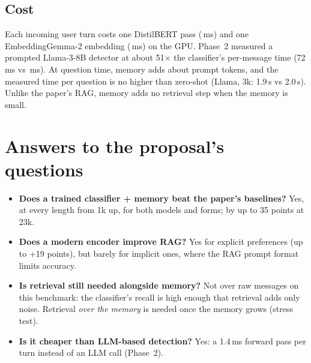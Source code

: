 \documentclass[11pt,a4paper]{article}
\begin{document}
\subsection{Cost}
Each incoming user turn costs one DistilBERT pass (\qClfLat\,ms) and one EmbeddingGemma-2 embedding (\qGemLat\,ms) on the GPU. Phase~2 measured
a prompted Llama-3-8B detector at about 51$\times$ the classifier's per-message time (72\,ms vs \qClfLat\,ms). At question time, memory adds about
\qTokAdd{} prompt tokens, and the measured time per question is no higher than zero-shot (Llama, 3k: 1.9\,s vs 2.0\,s). Unlike the paper's RAG, memory adds no retrieval step when the memory is small.

\section{Answers to the proposal's questions}
\begin{itemize}
  \item \textbf{Does a trained classifier + memory beat the paper's baselines?} Yes, at every length from 1k up, for both models and forms; by up to
        35 points at 23k.
  \item \textbf{Does a modern encoder improve RAG?} Yes for explicit preferences (up to +19 points), but barely for implicit ones, where the RAG prompt
        format limits accuracy.
  \item \textbf{Is retrieval still needed alongside memory?} Not over raw messages on this benchmark: the classifier's recall is high enough that
        retrieval adds only noise. Retrieval \emph{over the memory} is needed once the memory grows (stress test).
  \item \textbf{Is it cheaper than LLM-based detection?} Yes: a 1.4\,ms forward pass per turn instead of an LLM call (Phase~2).
\end{itemize}

\end{document}
